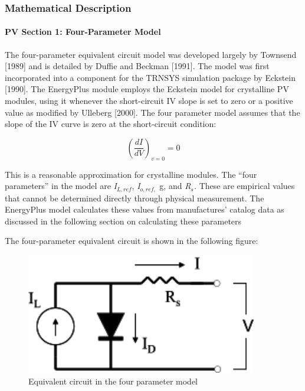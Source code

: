 \subsubsection{Mathematical Description}\label{mathematical-description-1}

\paragraph{PV Section 1: Four-Parameter Model}\label{pv-section-1-four-parameter-model}

The four-parameter equivalent circuit model was developed largely by Townsend {[}1989{]} and is detailed by Duffie and Beckman {[}1991{]}. The model was first incorporated into a component for the TRNSYS simulation package by Eckstein {[}1990{]}. The EnergyPlus module employs the Eckstein model for crystalline PV modules, using it whenever the short-circuit IV slope is set to zero or a positive value as modified by Ulleberg {[}2000{]}. The four parameter model assumes that the slope of the IV curve is zero at the short-circuit condition:

\begin{equation}
{\left( {\frac{{dI}}{{dV}}} \right)_{v = 0}} = 0
\end{equation}

This is a reasonable approximation for crystalline modules. The ``four parameters'' in the model are \emph{I\(_{L,ref}\)}, \emph{I\(_{o,ref,}\)} g, and \emph{R\(_{s}\).} These are empirical values that cannot be determined directly through physical measurement. The EnergyPlus model calculates these values from manufactures' catalog data as discussed in the following section on calculating these parameters

The four-parameter equivalent circuit is shown in the following figure:

\begin{figure}[hbtp] %
\centering
\includegraphics[width=0.9\textwidth, height=0.9\textheight, keepaspectratio=true]{media/image7592.svg.png}
\caption{Equivalent circuit in the four parameter model \protect \label{fig:equivalent-circuit-in-the-four-parameter}}
\end{figure}

